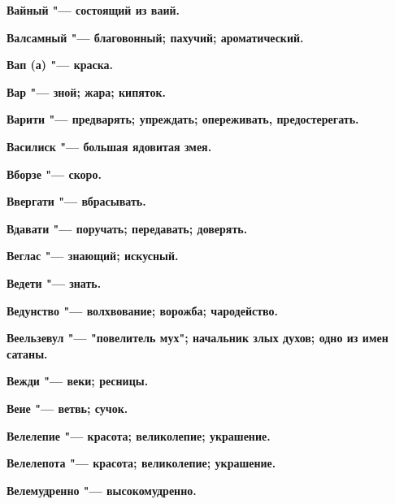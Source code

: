 \bfseries Вайный \normalfont{} "--- состоящий из ваий. 




\bfseries Валсамный \normalfont{} "--- благовонный; пахучий; ароматический. 




\bfseries Вап (а) \normalfont{} "--- краска. 




\bfseries Вар \normalfont{} "--- зной; жара; кипяток. 




\bfseries Варити \normalfont{} "--- предварять; упреждать; опереживать, предостерегать. 




\bfseries Василиск \normalfont{} "--- большая ядовитая змея. 




\bfseries Вборзе \normalfont{} "--- скоро. 




\bfseries Ввергати \normalfont{} "--- вбрасывать. 




\bfseries Вдавати \normalfont{} "--- поручать; передавать; доверять. 




\bfseries Веглас \normalfont{} "--- знающий; искусный. 




\bfseries Ведети \normalfont{} "--- знать. 




\bfseries Ведунство \normalfont{} "--- волхвование; ворожба; чародейство. 




\bfseries Веельзевул \normalfont{} "--- "повелитель мух"; начальник злых духов; одно из имен сатаны. 




\bfseries Вежди \normalfont{} "--- веки; ресницы. 




\bfseries Веие \normalfont{} "--- ветвь; сучок. 




\bfseries Велелепие \normalfont{} "--- красота; великолепие; украшение. 




\bfseries Велелепота \normalfont{} "--- красота; великолепие; украшение. 




\bfseries Велемудренно \normalfont{} "--- высокомудренно. 




